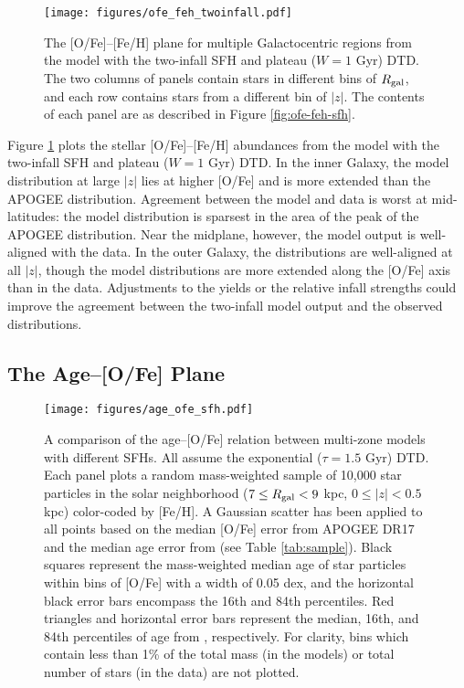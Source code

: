 \documentclass[twocolumn,twocolappendix,linenumbers]{aastex631}
\begin{document}
\begin{figure}
    \centering
    \texttt{[image: figures/ofe\_feh\_twoinfall.pdf]}
    \caption{The [O/Fe]--[Fe/H] plane for multiple Galactocentric regions from the model with the two-infall SFH and plateau ($W=1$ Gyr) DTD. The two columns of panels contain stars in different bins of $R_{\rm gal}$, and each row contains stars from a different bin of $|z|$. The contents of each panel are as described in Figure \ref{fig:ofe-feh-sfh}.}
    \label{fig:ofe-feh-twoinfall}
\end{figure}

Figure \ref{fig:ofe-feh-twoinfall} plots the stellar [O/Fe]--[Fe/H] abundances from the model with the two-infall SFH and plateau ($W=1$ Gyr) DTD. In the inner Galaxy, the model distribution at large $|z|$ lies at higher [O/Fe] and is more extended than the APOGEE distribution. Agreement between the model and data is worst at mid-latitudes: the model distribution is sparsest in the area of the peak of the APOGEE distribution. Near the midplane, however, the model output is well-aligned with the data. In the outer Galaxy, the distributions are well-aligned at all $|z|$, though the model distributions are more extended along the [O/Fe] axis than in the data. Adjustments to the yields or the relative infall strengths could improve the agreement between the two-infall model output and the observed distributions.

\subsection{The Age--[O/Fe] Plane}
\label{sec:age-ofe}

\begin{figure}
    \centering
    \texttt{[image: figures/age\_ofe\_sfh.pdf]}
    \caption{A comparison of the age--[O/Fe] relation between multi-zone models with different SFHs. All assume the exponential ($\tau=1.5$ Gyr) DTD. Each panel plots a random mass-weighted sample of 10,000 star particles in the solar neighborhood ($7\leq R_{\rm gal}<9$ kpc, $0\leq|z|<0.5$ kpc) color-coded by [Fe/H]. A Gaussian scatter has been applied to all points based on the median [O/Fe] error from APOGEE DR17 and the median age error from  (see Table \ref{tab:sample}). Black squares represent the mass-weighted median age of star particles within bins of [O/Fe] with a width of 0.05 dex, and the horizontal black error bars encompass the 16th and 84th percentiles. Red triangles and horizontal error bars represent the median, 16th, and 84th percentiles of age from , respectively. For clarity, bins which contain less than 1\% of the total mass (in the models) or total number of stars (in the data) are not plotted.}
    \label{fig:age-ofe-sfh}
\end{figure}
\end{document}
